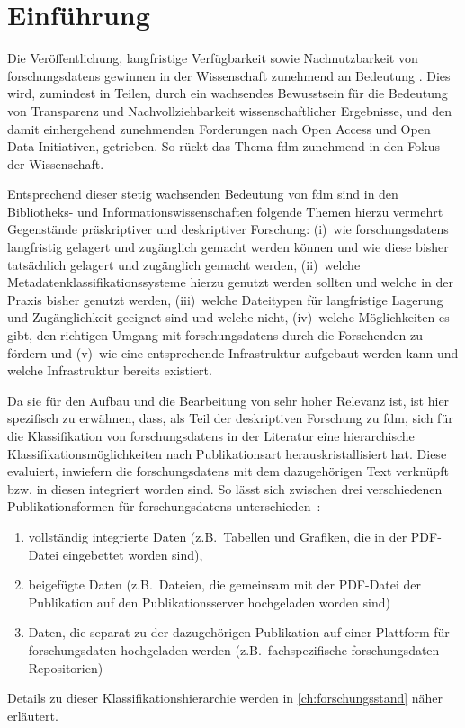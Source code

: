\chapter{Einführung}\label{ch:einfuehrung}

Die Veröffentlichung, langfristige Verfügbarkeit sowie Nachnutzbarkeit von \glspl{forschungsdaten} gewinnen in der Wissenschaft zunehmend an Bedeutung .
Dies wird, zumindest in Teilen, durch ein wachsendes Bewusstsein für die Bedeutung von Transparenz und Nachvollziehbarkeit wissenschaftlicher Ergebnisse, und den damit einhergehend zunehmenden Forderungen nach Open Access und Open Data Initiativen, getrieben.
So rückt das Thema \gls{fdm} zunehmend in den Fokus der Wissenschaft.

Entsprechend dieser stetig wachsenden Bedeutung von \gls{fdm} sind in den Bibliotheks- und Informationswissenschaften folgende Themen hierzu vermehrt Gegenstände präskriptiver und deskriptiver Forschung:
(i)~wie \glspl{forschungsdaten} langfristig gelagert und zugänglich gemacht werden können und wie diese bisher tatsächlich gelagert und zugänglich gemacht werden,
(ii)~welche Metadatenklassifikationssysteme hierzu genutzt werden sollten und welche in der Praxis bisher genutzt werden,
(iii)~welche Dateitypen für langfristige Lagerung und Zugänglichkeit geeignet sind und welche nicht,
(iv)~welche Möglichkeiten es gibt, den richtigen Umgang mit \glspl{forschungsdaten} durch die Forschenden zu fördern und
(v)~wie eine entsprechende Infrastruktur aufgebaut werden kann und welche Infrastruktur bereits existiert.

Da sie für den Aufbau und die Bearbeitung von sehr hoher Relevanz ist, ist hier spezifisch zu erwähnen, dass, als Teil der deskriptiven Forschung zu \gls{fdm}, sich für die Klassifikation von \glspl{forschungsdaten} in der Literatur eine hierarchische Klassifikationsmöglichkeiten nach Publikationsart herauskristallisiert hat.
Diese evaluiert, inwiefern die \glspl{forschungsdaten} mit dem dazugehörigen Text verknüpft bzw. in diesen integriert worden sind.
So lässt sich zwischen drei verschiedenen Publikationsformen für \glspl{forschungsdaten} unterschieden~\autocites[S.~36ff.]{ReillyEtAl2011}:
\begin{enumerate}
    \item vollständig integrierte Daten (z.B.~Tabellen und Grafiken, die in der PDF-Datei eingebettet worden sind),
    \item beigefügte Daten (z.B.~Dateien, die gemeinsam mit der PDF-Datei der Publikation auf den Publikationsserver hochgeladen worden sind)
    \item Daten, die separat zu der dazugehörigen Publikation auf einer Plattform für \gls{forschungsdaten} hochgeladen werden (z.B.~fachspezifische \gls{forschungsdaten}-Repositorien)
\end{enumerate}
Details zu dieser Klassifikationshierarchie werden in \cref{ch:forschungsstand} näher erläutert.

